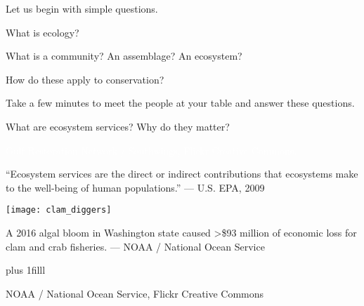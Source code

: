 \documentclass[t,handout]{beamer}  %
\begin{document}
{
\begin{frame}
\end{frame}
}

{
\begin{frame}
\end{frame}
}

{
\begin{frame}
\end{frame}
}

\begin{frame}[t]{Let us begin with simple questions.}

	\hangpara What is ecology?
	
	\hangpara What is a community? An assemblage? An ecosystem?

	\hangpara How do these apply to conservation?

	\hangpara Take a few minutes to meet the people at your table and answer these questions.

\end{frame}

{
\begin{frame}[b]{What are ecosystem services? Why do they matter?}

	
\tiny\hfill\textcolor{white}{Gulf Restoration Network / Southwings, Flickr Creative Commons.}

\end{frame}
}


\begin{frame}[t]
	
	“Ecosystem services are the direct or indirect contributions that ecosystems make to the well-being of human populations.” — U.S. EPA, 2009 \vspace*{\baselineskip}
	
	\texttt{[image: clam\_diggers]}
	
	A 2016 algal bloom in Washington state caused \textgreater \$93 million of economic loss for clam and crab fisheries. --- NOAA / National Ocean Service
	
	\vskip0pt plus 1filll
	
	\hfill\tiny NOAA / National Ocean Service, Flickr Creative Commons
	
\end{frame}
\end{document}
